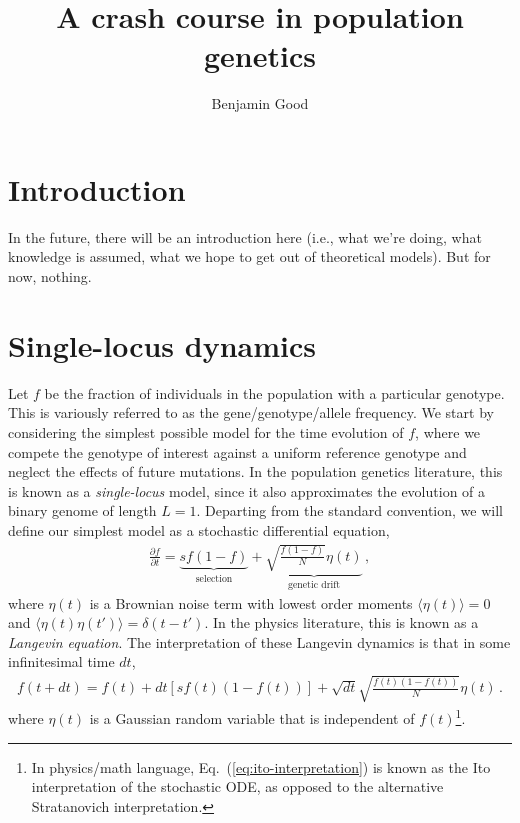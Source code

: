 \documentclass[11pt]{article}
\newcommand{\eq}[1]{Eq.~(\ref{#1})}
\begin{document}
\title{A crash course in population genetics}
\author{Benjamin Good}

\maketitle


\section{Introduction}

In the future, there will be an introduction here (i.e., what we're doing, what knowledge is assumed, what we hope to get out of theoretical models). But for now, nothing. 

\section{Single-locus dynamics} 

\noindent Let $f$ be the fraction of individuals in the population with a particular genotype. This is variously referred to as the gene/genotype/allele frequency. We start by considering the simplest possible model for the time evolution of $f$, where we compete the genotype of interest against a uniform reference genotype and neglect the effects of future mutations. In the population genetics literature, this is known as a \emph{single-locus} model, since it also approximates the evolution of a binary genome of length $L=1$. Departing from the standard convention, we will define our simplest model as a stochastic differential equation, 
\begin{align}
\label{eq:single-locus-langevin}
\frac{\partial f}{\partial t} = \underbrace{s f(1-f)}_\text{selection} + \underbrace{\sqrt{\frac{f(1-f)}{N}} \eta(t)}_\text{genetic drift} \, ,
\end{align}
where $\eta(t)$ is a Brownian noise term with lowest order moments $\langle \eta(t) \rangle = 0$ and $\langle \eta(t) \eta(t') \rangle = \delta(t-t')$. In the physics literature, this is known as a \emph{Langevin equation}. The interpretation of these Langevin dynamics is that in some infinitesimal time $dt$,
\begin{align}
\label{eq:ito-interpretation}
f(t+dt) = f(t) + dt \left[ s f(t)(1-f(t)) \right] + \sqrt{dt} \sqrt{\frac{f(t)(1-f(t))}{N}} \eta(t) \, .
\end{align} 
where $\eta(t)$ is a Gaussian random variable that is independent of $f(t)$\footnote{In physics/math language, \eq{eq:ito-interpretation} is known as the Ito interpretation of the stochastic ODE, as opposed to the alternative Stratanovich interpretation.}.
\end{document}
